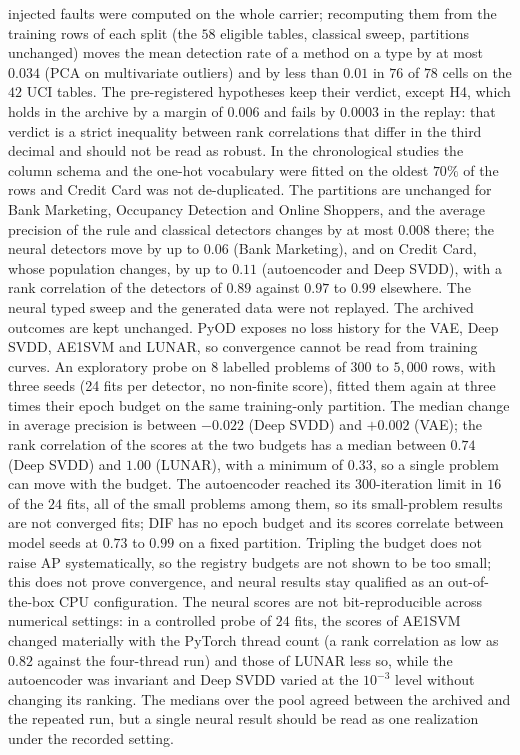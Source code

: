 \documentclass[conference]{IEEEtran}
\begin{document}
injected faults were computed on the whole carrier; recomputing them from the training rows of each split (the $58$ eligible
tables, classical sweep, partitions unchanged) moves the mean detection rate of a method on a type by at most $0.034$ (PCA on
multivariate outliers) and by less than $0.01$ in $76$ of $78$ cells on the $42$ UCI tables. The pre-registered hypotheses keep their verdict,
except H4, which holds in the archive by a margin of $0.006$ and fails by $0.0003$ in the replay: that verdict is a strict
inequality between rank correlations that differ in the third decimal and should not be read as robust. In the chronological studies the
column schema and the one-hot vocabulary were fitted on the oldest $70\%$ of the rows and Credit Card was not de-duplicated. The partitions are unchanged
for Bank Marketing, Occupancy Detection and Online Shoppers, and the average precision of the rule and classical detectors changes by at most $0.008$
there; the neural detectors move by up to $0.06$ (Bank Marketing), and on Credit Card, whose population changes, by up to $0.11$ (autoencoder
and Deep SVDD), with a rank correlation of the detectors of $0.89$ against $0.97$ to $0.99$ elsewhere. The neural typed sweep and the
generated data were not replayed. The archived outcomes are kept unchanged.
PyOD exposes no loss history for the VAE, Deep SVDD, AE1SVM and LUNAR, so convergence cannot be read from
training curves. An exploratory probe on $8$ labelled problems of $300$ to $5{,}000$ rows, with three seeds
(24 fits per detector, no non-finite score), fitted them again at three times their epoch budget on the same
training-only partition. The median change in average precision is between $-0.022$ (Deep SVDD) and $+0.002$ (VAE);
the rank correlation of the scores at the two budgets has a median between $0.74$ (Deep SVDD) and $1.00$ (LUNAR), with a minimum
of $0.33$, so a single problem can move with the budget. The autoencoder reached its $300$-iteration limit in
$16$ of the $24$ fits, all of the small problems among them, so its small-problem results are not converged
fits; DIF has no epoch budget and its scores correlate between model seeds at $0.73$ to $0.99$ on a fixed partition.
Tripling the budget does not raise AP systematically, so the registry budgets are not shown to be too small; this
does not prove convergence, and neural results stay qualified as an out-of-the-box CPU configuration.
The neural scores are not bit-reproducible across numerical settings: in a controlled probe of $24$ fits, the
scores of AE1SVM changed materially with the PyTorch thread count (a rank correlation as low as $0.82$ against
the four-thread run) and those of LUNAR less so, while the autoencoder was invariant and Deep SVDD varied at
the $10^{-3}$ level without changing its ranking. The medians over the pool agreed between the archived and
the repeated run, but a single neural result should be read as one realization under the recorded setting.
\end{document}
